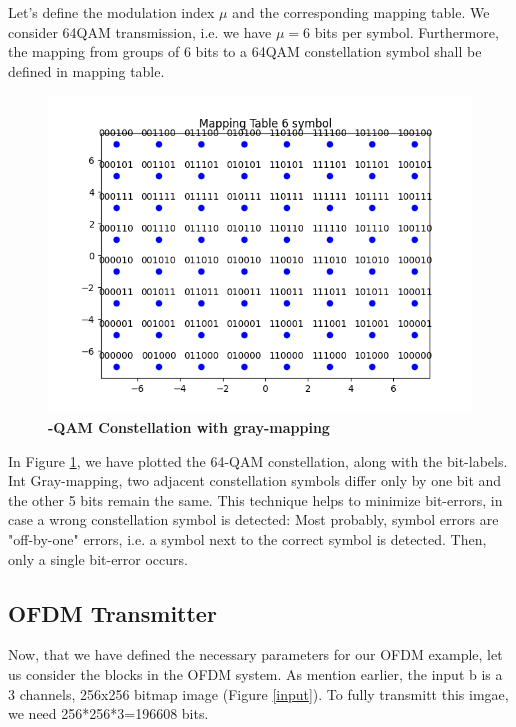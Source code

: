 Let's define the modulation index $\mu$ and the corresponding mapping table. We consider 64QAM transmission, i.e. we have $\mu=6$ bits per symbol. Furthermore, the mapping from groups of 6 bits to a 64QAM constellation symbol shall be defined in mapping table.

\begin{figure}[ht]
    \centering
    \includegraphics[width=\textwidth]{../Source/results/mapping.png}
    \caption{\bfseries\centering\fontsize{13pt}{0pt}-QAM Constellation with gray-mapping}
    \label{mapping}
\end{figure}

In Figure \ref{mapping}, we have plotted the 64-QAM constellation, along with the bit-labels.
Int Gray-mapping, two adjacent constellation symbols differ only by one bit and the other 5 bits remain the same. This technique helps to minimize bit-errors, in case a wrong constellation symbol is detected: Most probably, symbol errors are "off-by-one" errors, i.e. a symbol next to the correct symbol is detected. Then, only a single bit-error occurs.

\subsection{OFDM Transmitter}

Now, that we have defined the necessary parameters for our OFDM example, let us consider the blocks in the OFDM system. As mention earlier, the input b is a 3 channels, 256x256 bitmap image (Figure \ref{input}). To fully transmitt this imgae, we need 256*256*3=196608 bits.

